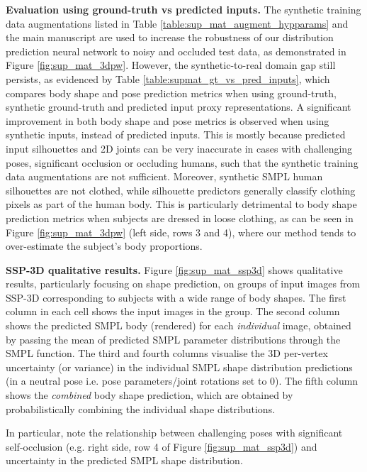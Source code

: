 \documentclass[final]{cvpr}
\begin{document}
\noindent \textbf{Evaluation using ground-truth vs predicted inputs.} The synthetic training data augmentations listed in Table \ref{table:sup_mat_augment_hypparams} and the main manuscript are used to increase the robustness of our distribution prediction neural network to noisy and occluded test data, as demonstrated in Figure \ref{fig:sup_mat_3dpw}. However, the synthetic-to-real domain gap still persists, as evidenced by Table \ref{table:supmat_gt_vs_pred_inputs}, which compares body shape and pose prediction metrics when using ground-truth, synthetic ground-truth and predicted input proxy representations. A significant improvement in both body shape and pose metrics is observed when using synthetic inputs, instead of predicted inputs. This is mostly because predicted input silhouettes and 2D joints can be very inaccurate in cases with challenging poses, significant occlusion or occluding humans, such that the synthetic training data augmentations are not sufficient.  Moreover, synthetic SMPL human silhouettes are not clothed, while silhouette predictors generally classify clothing pixels as part of the human body. This is particularly detrimental to body shape prediction metrics when subjects are dressed in loose clothing, as can be seen in Figure \ref{fig:sup_mat_3dpw} (left side, rows 3 and 4), where our method tends to over-estimate the subject's body proportions.

\noindent \textbf{SSP-3D qualitative results.}
Figure \ref{fig:sup_mat_ssp3d} shows qualitative results, particularly focusing on shape prediction, on groups of input images from SSP-3D \cite{STRAPS2020BMVC} corresponding to subjects with a wide range of body shapes. The first column in each cell shows the input images in the group. The second column shows the predicted SMPL \cite{SMPL:2015} body (rendered) for each \textit{individual} image, obtained by passing the mean of predicted SMPL parameter distributions through the SMPL function. The third and fourth columns visualise the 3D per-vertex uncertainty (or variance) in the individual SMPL shape distribution predictions (in a neutral pose i.e. pose parameters/joint rotations set to 0). The fifth column shows the \textit{combined} body shape prediction, which are obtained by probabilistically combining the individual shape distributions. 

In particular, note the relationship between challenging poses with significant self-occlusion (e.g. right side, row 4 of Figure \ref{fig:sup_mat_ssp3d}) and uncertainty in the predicted SMPL shape distribution.
\end{document}
